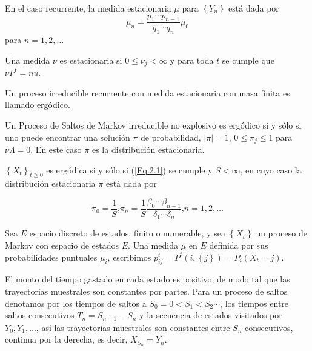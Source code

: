 \begin{Cor}\label{Corolario2.3}
En el caso recurrente, la medida estacionaria $\mu$ para
$\left\{Y_{n}\right\}$ est\'a dada por
\begin{equation}\label{Eq.2.3}
\mu_{n}=\frac{p_{1}\cdots p_{n-1}}{q_{1}\cdots q_{n}}\mu_{0}
\end{equation}
para $n=1,2,\ldots$
\end{Cor}

\begin{Def}
Una medida $\nu$ es estacionaria si $0\leq\nu_{j}<\infty$ y para toda $t$ se cumple que $\nu P^{t}=nu$.
\end{Def}


\begin{Def}
Un proceso irreducible recurrente con medida estacionaria con masa finita es llamado erg\'odico.
\end{Def}

\begin{Teo}\label{Teo4.3}
Un Proceso de Saltos de Markov irreducible no explosivo es erg\'odico si y s\'olo si uno puede encontrar una soluci\'on $\pi$ de probabilidad, $|\pi|=1$, $0\leq\pi_{j}\leq1$ para $\nu\Lambda=0$. En este caso $\pi$ es la distribuci\'on estacionaria.
\end{Teo}
\begin{Cor}\label{Corolario2.4}
$\left\{X_{t}\right\}_{t\geq0}$ es erg\'odica si y s\'olo si (\ref{Eq.2.1}) se cumple y $S<\infty$, en cuyo caso la distribuci\'on estacionaria $\pi$ est\'a dada por

\begin{equation}\label{Eq.2.4}
\pi_{0}=\frac{1}{S}\textrm{,
}\pi_{n}=\frac{1}{S}\frac{\beta_{0}\cdots\beta_{n-1}}{\delta_{1}\cdots\delta_{n}}\textrm{,
}n=1,2,\ldots
\end{equation}
\end{Cor}


Sea $E$ espacio discreto de estados, finito o numerable, y sea $\left\{X_{t}\right\}$ un proceso de Markov con espacio de estados $E$. Una medida $\mu$ en $E$ definida por sus probabilidades puntuales $\mu_{i}$, escribimos $p_{ij}^{t}=P^{t}\left(i,\left\{j\right\}\right)=P_{i}\left(X_{t}=j\right)$.

El monto del tiempo gastado en cada estado es positivo, de modo tal que las trayectorias muestrales son constantes por partes. Para un proceso de saltos denotamos por los tiempos de saltos a $S_{0}=0<S_{1}<S_{2}\cdots$, los tiempos entre saltos consecutivos $T_{n}=S_{n+1}-S_{n}$ y la secuencia de estados visitados por $Y_{0},Y_{1},\ldots$, as\'i las trayectorias muestrales son constantes entre $S_{n}$ consecutivos, continua por la derecha, es decir, $X_{S_{n}}=Y_{n}$. 

